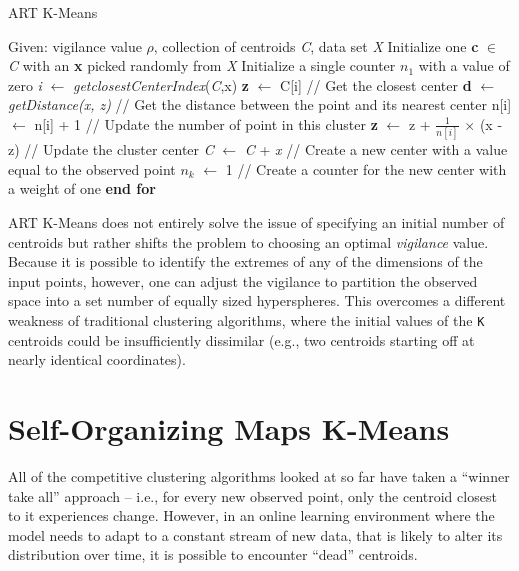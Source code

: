 \documentclass{l4proj}
\begin{document}
\begin{algorithm}[H]
\caption{ART K-Means}\label{art-alg}
\begin{algorithmic}[1]
\State Given: vigilance value $\rho$, collection of centroids \textit{C}, data set \textit{X}
\State Initialize one \textbf{c} $\in$ \textit{C} with an \textbf{x} picked randomly from \textit{X}
\State Initialize a single counter $n_{1}$ with a value of zero
    \State \textit{i}  $\gets$ \textit{getclosestCenterIndex}(\textit{C},x)
    \State \textbf{z}  $\gets$ C[i] \hspace{2.35cm} // Get the closest center
    \State \textbf{d} $\gets$ \textit{getDistance(x, z)} \hspace{0.3cm} // Get the distance between the point and its nearest center
        \State n[i] $\gets$ n[i] + 1 \hspace{1.3cm} // Update the number of point in this cluster
        \State \textbf{z} $\gets$ z + $\frac{1}{n[i]}$ $\times$ (x - z) \hspace{0.35cm} // Update the cluster center
    \Else
        \State \textit{C} $\gets$ \textit{C} + \textit{x} \hspace{0.55cm} // Create a new center with a value equal to the observed point
        \State $n_k$ $\gets$ 1 \hspace{1cm} // Create a counter for the new center with a weight of one
    \EndIf
\EndFor
\State \textbf{end for}
\end{algorithmic}
\end{algorithm}

ART K-Means does not entirely solve the issue of specifying an initial number of centroids but rather shifts the problem to choosing an optimal \textit{vigilance} value. Because it is possible to identify the extremes of any of the dimensions of the input points, however, one can adjust the vigilance to partition the observed space into a set number of equally sized hyperspheres. This overcomes a different weakness of traditional clustering algorithms, where the initial values of the \texttt{K} centroids could be insufficiently dissimilar (e.g., two centroids starting off at nearly identical coordinates).

\section{Self-Organizing Maps K-Means}

All of the competitive clustering algorithms looked at so far have taken a ``winner take all'' approach -- i.e., for every new observed point, only the centroid closest to it experiences change. However, in an online learning environment where the model needs to adapt to a constant stream of new data, that is likely to alter its distribution over time, it is possible to encounter ``dead'' centroids.
\end{document}
